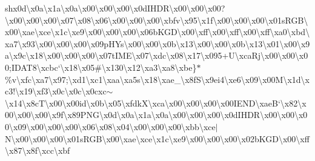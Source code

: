 sh{}x0d\textbackslash{}x0a\textbackslash{}x1a\textbackslash{}x0a\textbackslash{}x00\textbackslash{}x00\textbackslash{}x00\textbackslash{}x0d\+I\+H\+D\+R\textbackslash{}x00\textbackslash{}x00\textbackslash{}x00?\textbackslash{}x00\textbackslash{}x00\textbackslash{}x00\textbackslash{}x07\textbackslash{}x08\textbackslash{}x06\textbackslash{}x00\textbackslash{}x00\textbackslash{}x00\textbackslash{}xbfv\textbackslash{}x95\textbackslash{}x1f\textbackslash{}x00\textbackslash{}x00\textbackslash{}x00\textbackslash{}x01s\+R\+G\+B\textbackslash{}x00\textbackslash{}xae\textbackslash{}xce\textbackslash{}x1c\textbackslash{}xe9\textbackslash{}x00\textbackslash{}x00\textbackslash{}x00\textbackslash{}x06b\+K\+G\+D\textbackslash{}x00\textbackslash{}xff\textbackslash{}x00\textbackslash{}xff\textbackslash{}x00\textbackslash{}xff\textbackslash{}xa0\textbackslash{}xbd\textbackslash{}xa7\textbackslash{}x93\textbackslash{}x00\textbackslash{}x00\textbackslash{}x00\textbackslash{}x09p\+H\+Ys\textbackslash{}x00\textbackslash{}x00\textbackslash{}x0b\textbackslash{}x13\textbackslash{}x00\textbackslash{}x00\textbackslash{}x0b\textbackslash{}x13\textbackslash{}x01\textbackslash{}x00\textbackslash{}x9a\textbackslash{}x9c\textbackslash{}x18\textbackslash{}x00\textbackslash{}x00\textbackslash{}x00\textbackslash{}x07t\+I\+M\+E\textbackslash{}x07\textbackslash{}xdc\textbackslash{}x08\textbackslash{}x17\textbackslash{}x095+\+U\textbackslash{}xca\+Rj\textbackslash{}x00\textbackslash{}x00\textbackslash{}x00;\+I\+D\+A\+T8\textbackslash{}xcbc`\textbackslash{}x18\textbackslash{}x05\#\textbackslash{}x130\textbackslash{}x12\textbackslash{}xa3\textbackslash{}xa8\textbackslash{}xbe\}$\ast$\%v\textbackslash{}xfc\textbackslash{}xa7\textbackslash{}x97;\textbackslash{}xd1\textbackslash{}xc1\textbackslash{}xaa\textbackslash{}xa5s\textbackslash{}x18\textbackslash{}xae\+\_\textbackslash{}x8f\+S\textbackslash{}x9ei4\textbackslash{}xe6\textbackslash{}x09\textbackslash{}x00\+M\textbackslash{}x1d\textbackslash{}xc3!\textbackslash{}x19\textbackslash{}xf3\textbackslash{}x0c\textbackslash{}x0c\textbackslash{}x0cxc$\sim$\textbackslash{}x14\textbackslash{}x8c\+T\textbackslash{}x00\textbackslash{}x00id\textbackslash{}x0b\textbackslash{}x05\textbackslash{}xfdk\+X\textbackslash{}xca\textbackslash{}x00\textbackslash{}x00\textbackslash{}x00\textbackslash{}x00\+I\+E\+N\+D\textbackslash{}xae\+B`\textbackslash{}x82\textbackslash{}x00\textbackslash{}x00\textbackslash{}x00\textbackslash{}x9f\textbackslash{}x89\+P\+N\+G\textbackslash{}x0d\textbackslash{}x0a\textbackslash{}x1a\textbackslash{}x0a\textbackslash{}x00\textbackslash{}x00\textbackslash{}x00\textbackslash{}x0d\+I\+H\+D\+R\textbackslash{}x00\textbackslash{}x00\textbackslash{}x00\textbackslash{}x09\textbackslash{}x00\textbackslash{}x00\textbackslash{}x00\textbackslash{}x06\textbackslash{}x08\textbackslash{}x04\textbackslash{}x00\textbackslash{}x00\textbackslash{}x00\textbackslash{}xbb\textbackslash{}xce$\vert$\+N\textbackslash{}x00\textbackslash{}x00\textbackslash{}x00\textbackslash{}x01s\+R\+G\+B\textbackslash{}x00\textbackslash{}xae\textbackslash{}xce\textbackslash{}x1c\textbackslash{}xe9\textbackslash{}x00\textbackslash{}x00\textbackslash{}x00\textbackslash{}x02b\+K\+G\+D\textbackslash{}x00\textbackslash{}xff\textbackslash{}x87\textbackslash{}x8f\textbackslash{}xcc\textbackslash{}xbf\